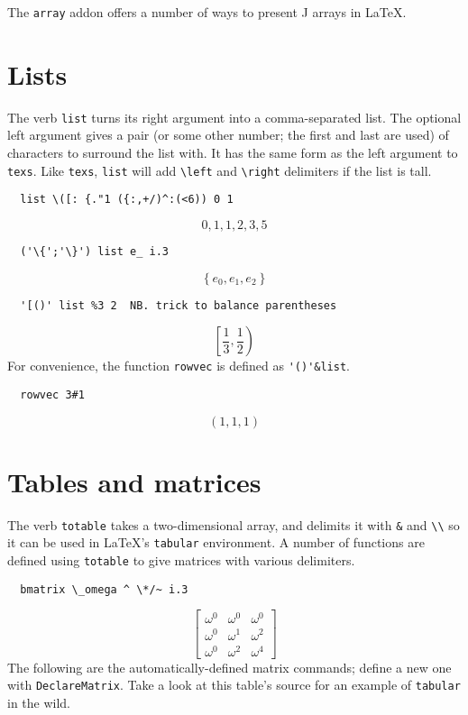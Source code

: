 \documentclass{article}
\begin{document}
The \lstinline`array` addon offers a number of ways to present J arrays in LaTeX.

\section{Lists}
The verb \lstinline`list` turns its right argument into a comma-separated list.
The optional left argument gives a pair (or some other number; the first
and last are used) of characters to surround the list with.
It has the same form as the left argument to \lstinline`texs`.
Like \lstinline`texs`, \lstinline`list` will add \lstinline`\left` and \lstinline`\right` delimiters if
the list is tall.
\begin{lstlisting}
  list \([: {."1 ({:,+/)^:(<6)) 0 1
\end{lstlisting}
\[0,1,1,2,3,5\]
\begin{lstlisting}
  ('\{';'\}') list e_ i.3
\end{lstlisting}
\[\left\{e_0,e_1,e_2\right\}\]
\begin{lstlisting}
  '[()' list %3 2  NB. trick to balance parentheses
\end{lstlisting}
\[\left[\frac{1}{3},\frac{1}{2}\right)\]
For convenience, the function \lstinline`rowvec` is defined as \lstinline`'()'&list`.
\begin{lstlisting}
  rowvec 3#1
\end{lstlisting}
\[(1,1,1)\]

\section{Tables and matrices}
The verb \lstinline`totable` takes a two-dimensional array, and delimits it with
\lstinline`&` and \lstinline`\\` so it can be used in LaTeX's \lstinline`tabular` environment.
A number of functions are defined using \lstinline`totable` to give matrices with
various delimiters.
\begin{lstlisting}
  bmatrix \_omega ^ \*/~ i.3
\end{lstlisting}
\[\begin{bmatrix}
  \omega^0 & \omega^0 & \omega^0 \\
  \omega^0 & \omega^1 & \omega^2 \\
  \omega^0 & \omega^2 & \omega^4
\end{bmatrix}
\]
The following are the automatically-defined matrix commands; define a new
one with \lstinline`DeclareMatrix`. Take a look at this table's source for an
example of \lstinline`tabular` in the wild.
\end{document}
